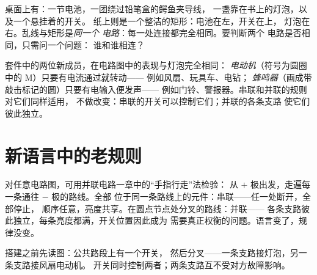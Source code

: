\begin{example}[同一电路的两幅画像]\label{ex:g6:circuits-and-safety:portraits}
桌面上有：一节电池，一团绕过铅笔盒的鳄鱼夹导线，
一盏靠在书上的灯泡，以及一个悬挂着的开关。
纸上则是一个整洁的矩形：电池在左，开关在上，
灯泡在右。乱线与矩形是\emph{同一个
电路}：每一处连接都完全相同。要判断两个
电路是否相同，只需问一个问题：
谁和谁相连？
\end{example}

\begin{example}[电动机与蜂鸣器登场]\label{ex:g6:circuits-and-safety:motor}
套件中的两位新成员，在电路图中的表现与灯泡完全相同：
\emph{电动机}（符号为圆圈中的 M）只要有电流通过就转动——
例如风扇、玩具车、电钻；
\emph{蜂鸣器}（画成带敲击标记的圆）只要有电输入便发声——
例如门铃、警报器。串联和并联的规则对它们同样适用，
不做改变：串联的开关可以控制它们；并联的各条支路
使它们彼此独立。
\end{example}

\section{新语言中的老规则}

\begin{example}[像行家一样读图]\label{ex:g6:circuits-and-safety:reading}
对任意电路图，可用并联电路一章中的“手指行走”法检验：
从 $+$ 极出发，走遍每一条通往 $-$ 极的路线。全部
位于同一条路线上的元件：串联——任一处断开，全部停止，
顺序任意，亮度共享。在圆点节点处分叉的路线：并联——
各条支路彼此独立，每条亮度都满，开关位置因此成为
需要真正权衡的问题。语言变了，规律没变。
\end{example}

\begin{omfigure}

{\small 搭建之前先读图：公共路段上有一个开关，
然后分叉——一条支路接灯泡，另一条支路接风扇电动机。
开关同时控制两者；两条支路互不受对方故障影响。}
\end{omfigure}

